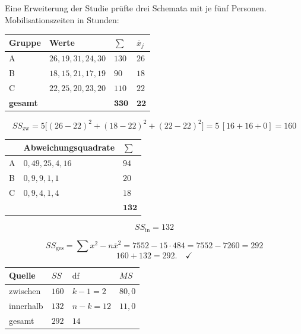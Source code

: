 \begin{merksatz}
Eine Erweiterung der Studie prüfte drei Schemata mit je fünf Personen. Mobilisationszeiten in Stunden:

\begin{center}
{\small
\renewcommand{\arraystretch}{1.35}
\begin{tabular}{@{}P{1.4cm}P{4.0cm}P{1.4cm}P{1.4cm}@{}}
\toprule
\textbf{Gruppe} & \textbf{Werte} & $\sum$ & $\overline x_j$\\
\midrule
A & $26, 19, 31, 24, 30$ & $130$ & $26$\\
B & $18, 15, 21, 17, 19$ & $90$ & $18$\\
C & $22, 25, 20, 23, 20$ & $110$ & $22$\\
\midrule
\textbf{gesamt} & & $\mathbf{330}$ & $\mathbf{22}$\\
\bottomrule
\end{tabular}}
\end{center}

\[ SS_{\text{zw}} = 5\bigl[(26-22)^2 + (18-22)^2 + (22-22)^2\bigr] = 5\,[16+16+0] = 160 \]

\begin{center}
{\small
\renewcommand{\arraystretch}{1.35}
\begin{tabular}{@{}P{1.2cm}P{4.4cm}P{1.6cm}@{}}
\toprule
& \textbf{Abweichungsquadrate} & $\sum$\\
\midrule
A & $0, 49, 25, 4, 16$ & $94$\\
B & $0, 9, 9, 1, 1$ & $20$\\
C & $0, 9, 4, 1, 4$ & $18$\\
\midrule
& & $\mathbf{132}$\\
\bottomrule
\end{tabular}}
\end{center}
\[ SS_{\text{in}} = 132 \]

\[ SS_{\text{ges}} = \sum x^2 - n\overline x^2 = 7552 - 15 \cdot 484 = 7552 - 7260 = 292 \]
\[ 160 + 132 = 292 . \quad \checkmark \]

\begin{center}
\renewcommand{\arraystretch}{1.45}
\begin{tabular}{@{}P{2.4cm}P{1.6cm}P{1.6cm}P{1.8cm}@{}}
\toprule
\textbf{Quelle} & $SS$ & $\mathrm{df}$ & $MS$\\
\midrule
zwischen & $160$ & $k-1 = 2$ & $80{,}0$\\
innerhalb & $132$ & $n-k = 12$ & $11{,}0$\\
\midrule
gesamt & $292$ & $14$ & \\
\bottomrule
\end{tabular}
\end{center}


\end{merksatz}
